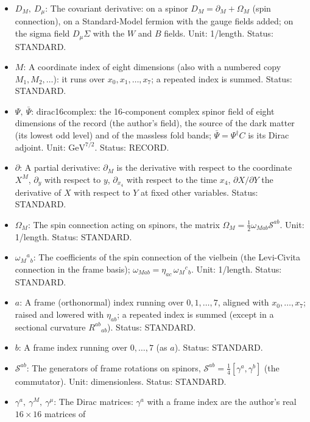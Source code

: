 \documentclass[
  10pt,
]{article}
\providecommand{\tightlist}{%
  \setlength{\itemsep}{0pt}\setlength{\parskip}{0pt}}
\begin{document}
\begin{itemize}
\tightlist
\item
  \(D_M,\ D_\mu\): The covariant derivative: on a spinor
  \(D_M = \partial_M + \Omega_M\) (spin connection), on a Standard-Model
  fermion with the gauge fields added; on the sigma field
  \(D_\mu\Sigma\) with the \(W\) and \(B\) fields. Unit: 1/length.
  Status: STANDARD.
\item
  \(M\): A coordinate index of eight dimensions (also with a numbered
  copy \(M_1, M_2, \dots\)): it runs over \(x_0, x_1, \dots, x_7\); a
  repeated index is summed. Status: STANDARD.
\item
  \(\Psi,\ \bar\Psi\): dirac16complex: the 16-component complex spinor
  field of eight dimensions of the record (the author's field), the
  source of the dark matter (its lowest odd level) and of the massless
  fold bands; \(\bar\Psi = \Psi^\dagger C\) is its Dirac adjoint. Unit:
  \(\mathrm{GeV}^{7/2}\). Status: RECORD.
\item
  \(\partial\): A partial derivative: \(\partial_M\) is the derivative
  with respect to the coordinate \(X^M\), \(\partial_y\) with respect to
  \(y\), \(\partial_{x_4}\) with respect to the time \(x_4\),
  \(\partial X/\partial Y\) the derivative of \(X\) with respect to
  \(Y\) at fixed other variables. Status: STANDARD.
\item
  \(\Omega_M\): The spin connection acting on spinors, the matrix
  \(\Omega_M = \frac12\omega_{Mab}\mathcal{S}^{ab}\). Unit: 1/length.
  Status: STANDARD.
\item
  \(\omega_M{}^a{}_b\): The coefficients of the spin connection of the
  vielbein (the Levi-Civita connection in the frame basis);
  \(\omega_{Mab} = \eta_{ac}\,\omega_M{}^c{}_b\). Unit: 1/length.
  Status: STANDARD.
\item
  \(a\): A frame (orthonormal) index running over \(0, 1, \dots, 7\),
  aligned with \(x_0, \dots, x_7\); raised and lowered with
  \(\eta_{ab}\); a repeated index is summed (except in a sectional
  curvature \(R^{ab}{}_{ab}\)). Status: STANDARD.
\item
  \(b\): A frame index running over \(0, \dots, 7\) (as \(a\)). Status:
  STANDARD.
\item
  \(\mathcal{S}^{ab}\): The generators of frame rotations on spinors,
  \(\mathcal{S}^{ab} = \frac14[\gamma^a, \gamma^b]\) (the commutator).
  Unit: dimensionless. Status: STANDARD.
\item
  \(\gamma^a,\ \gamma^M,\ \gamma^\mu\): The Dirac matrices: \(\gamma^a\)
  with a frame index are the author's real \(16 \times 16\) matrices of

\end{itemize}
\end{document}
